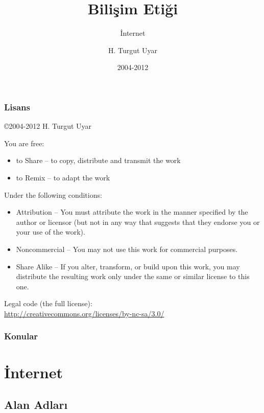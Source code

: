 \documentclass[dvipsnames]{beamer}
\title{Bilişim Etiği}
\subtitle{İnternet}
\author{H. Turgut Uyar}
\date{2004-2012}
\theoremstyle{definition}
\theoremstyle{example}
\theoremstyle{plain}
\begin{document}
\begin{frame}
  \titlepage
\end{frame}

\begin{frame}
  \frametitle{Lisans}

  \hfill
  \copyright 2004-2012 H. Turgut Uyar

  \vfill
  \begin{tiny}
    You are free:
    \begin{itemize}
      \item to Share -- to copy, distribute and transmit the work
      \item to Remix -- to adapt the work
    \end{itemize}

    Under the following conditions:
    \begin{itemize}
      \item Attribution -- You must attribute the work in the manner specified by
        the author or licensor (but not in any way that suggests that they
        endorse you or your use of the work).

      \item Noncommercial -- You may not use this work for commercial purposes.

      \item Share Alike -- If you alter, transform, or build upon this work, you
        may distribute the resulting work only under the same or similar license
        to this one.
    \end{itemize}
  \end{tiny}

  \vfill
  Legal code (the full license):\\
  \url{http://creativecommons.org/licenses/by-nc-sa/3.0/}
\end{frame}

\begin{frame}
  \frametitle{Konular}
  \tableofcontents
\end{frame}

\section{İnternet}

\subsection{Alan Adları}
\end{document}
